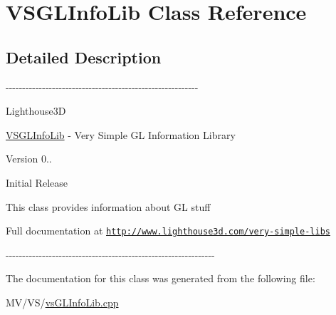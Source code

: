 \hypertarget{class_v_s_g_l_info_lib}{\section{\-V\-S\-G\-L\-Info\-Lib \-Class \-Reference}
\label{class_v_s_g_l_info_lib}
}


\subsection{\-Detailed \-Description}
-\/-\/-\/-\/-\/-\/-\/-\/-\/-\/-\/-\/-\/-\/-\/-\/-\/-\/-\/-\/-\/-\/-\/-\/-\/-\/-\/-\/-\/-\/-\/-\/-\/-\/-\/-\/-\/-\/-\/-\/-\/-\/-\/-\/-\/-\/-\/-\/-\/-\/-\/-\/-\/-\/-\/-\/-\/-\/

\-Lighthouse3\-D

\hyperlink{class_v_s_g_l_info_lib}{\-V\-S\-G\-L\-Info\-Lib} -\/ \-Very \-Simple \-G\-L \-Information \-Library

\begin{DoxyVersion}{\-Version}
0..
\begin{DoxyItemize}
\item \-Initial \-Release
\end{DoxyItemize}
\end{DoxyVersion}
\-This class provides information about \-G\-L stuff

\-Full documentation at \href{http://www.lighthouse3d.com/very-simple-libs}{\tt http\-://www.\-lighthouse3d.\-com/very-\/simple-\/libs}

-\/-\/-\/-\/-\/-\/-\/-\/-\/-\/-\/-\/-\/-\/-\/-\/-\/-\/-\/-\/-\/-\/-\/-\/-\/-\/-\/-\/-\/-\/-\/-\/-\/-\/-\/-\/-\/-\/-\/-\/-\/-\/-\/-\/-\/-\/-\/-\/-\/-\/-\/-\/-\/-\/-\/-\/-\/-\/-\/-\/-\/-\/-\/ 

\-The documentation for this class was generated from the following file\-:\begin{DoxyCompactItemize}
\item 
\-M\-V/\-V\-S/\hyperlink{vs_g_l_info_lib_8cpp}{vs\-G\-L\-Info\-Lib.\-cpp}\end{DoxyCompactItemize}
